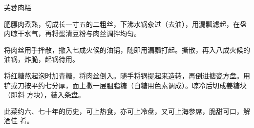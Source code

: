 \begin{recipe}{芙蓉肉糕}

\ingredients


\preparation

\step 肥膘肉煮熟，切成长一寸五的二粗丝，下沸水锅汆过（去油），用漏瓢滤起，在盘
内晾干水气，再将蛋清豆粉与肉丝调拌均匀。

\step 将肉丝用手拌散，撒入七成火候的油锅，随即用漏瓢打起。撕散，再入八成火候的
油锅，炸脆，起锅待用。

\step 将红糖熬起泡时加青糖，将肉丝倒入。随手将锅提起来造转，再倒进搪瓷方盘。用
铲或刀按平约七分厚，面上撒一层胭脂糖（白糖用色素调成）。晾冷后切成姜糖块（即斜
方块），装入条盘。

\features

此菜约六、七十年的历史，可上热食，亦可上冷盘，又可上海参席，脆甜可口，解酒佳
肴。

\end{recipe}

